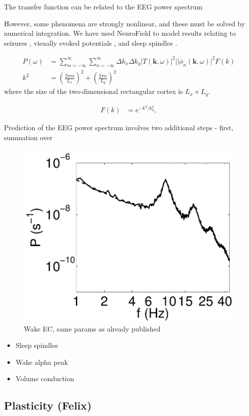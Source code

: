 \documentclass[preprint,review,10pt,authoryear,letterpaper]{elsarticle}
\begin{document}
The transfer function can be related to the EEG power spectrum 

However, some phenomena are strongly nonlinear, and these must be solved by numerical integration. We have used NeuroField to model results relating to seizures \citep{Roberts2008}, visually evoked potentials \citep{Roberts2012a}, and sleep spindles \citep{Abeysuriya2013,Abeysuriya2013a}. 



\begin{align}
\label{eqn:power_sum}
P(\omega) &= \sum_{m = -\infty}^{\infty}\sum_{n = -\infty}^{\infty} \Delta k_x \Delta k_y |T(\mathbf{k},\omega)|^2||\phi_n(\mathbf{k},\omega)|^2F(k)\\
k^2 &=  \left( \frac{2\pi m}{L_x} \right)^2 + \left( \frac{2\pi n}{L_y}\right)^2 
\end{align}
where the size of the two-dimensional rectangular cortex is $L_x \times L_y$. 

\begin{align}
F(k) &= e^{-k^2/k_0^2},
\end{align}


Prediction of the EEG power spectrum involves two additional steps - first, summation over 
\begin{figure}[!b]
\begin{center}
\includegraphics[width=0.40\columnwidth]{corticothalamic_comparison}
\caption{Wake EC, same params as already published}
\label{fig:ct_spectrum_1}
\end{center}
\end{figure}

\begin{itemize}
	\item Sleep spindles
	\item Wake alpha peak
	\item Volume conduction
\end{itemize}

\subsection{Plasticity (Felix)}
\end{document}
